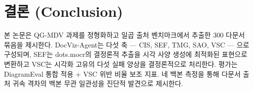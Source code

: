 \documentclass[11pt]{article}
\begin{document}
\section{결론 (Conclusion)}

본 논문은 QG-MDV 과제를 정형화하고 일곱 출처 벤치마크에서 추출한 300 다문서 묶음을 제시한다. DocViz-Agent는 다섯 축 — CIS, SEF, TMG, SAO, VSC — 으로 구성되며, SEF는 dots.mocr의 결정론적 추출을 시각 사양 생성에 최적화된 표현으로 변환하고 VSC는 시각화 고유의 다섯 실패 양상을 결정론적으로 처리한다. 평가는 DiagramEval 통합 적용 + VSC 위반 비율 보조 지표. 네 백본 측정을 통해 다문서 출처 귀속 격차의 백본 무관 일관성을 진단적 발견으로 제시한다.


\end{document}

